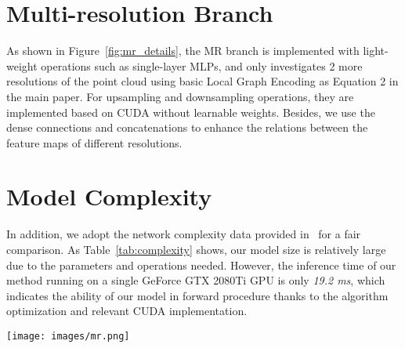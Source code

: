 \documentclass[10pt,twocolumn,letterpaper]{article}
\begin{document}
\section{Multi-resolution Branch}
As shown in Figure~\ref{fig:mr_details}, the MR branch is implemented with light-weight operations such as single-layer MLPs, and only investigates 2 more resolutions of the point cloud using basic Local Graph Encoding as Equation 2 in the main paper. For upsampling and downsampling operations, they are implemented based on CUDA without learnable weights. Besides, we use the dense connections and concatenations to enhance the relations between the feature maps of different resolutions.

\section{Model Complexity}
In addition, we adopt the network complexity data provided in~\cite{wang2019dynamic} for a fair comparison. As Table~\ref{tab:complexity} shows, our model size is relatively large due to the parameters and operations needed. However, the inference time of our method running on a single GeForce GTX 2080Ti GPU is only \emph{19.2 ms}, which indicates the ability of our model in forward procedure thanks to the algorithm optimization and relevant CUDA implementation.

\begin{figure*}
\begin{center}
\texttt{[image: images/mr.png]}
\end{center}
\caption{The input of the MR branch is the output of the first error-minimizing module in the FR branch, while the output of the MR branch merges with the output of the FR branch following the behavior as Equation 4 in the main paper.}
\label{fig:mr_details}
\end{figure*}
\end{document}
